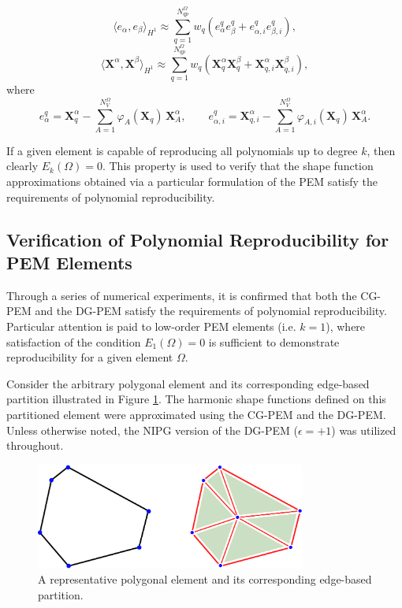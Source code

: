 \begin{equation}
        \langle e_\alpha, e_\beta \rangle_{H^1} \approx \sum_{q=1}^{N^{\Omega}_{qp}} w_q (e_{\alpha}^{q} e_{\beta}^{q} + e_{\alpha,i}^{q} e_{\beta,i}^{q}),
\end{equation}
\begin{equation}
        \langle \mathbf{X}^\alpha, \mathbf{X}^\beta \rangle_{H^1} \approx \sum_{q=1}^{N^{\Omega}_{qp}} w_q (\mathbf{X}^{\alpha}_{q} \mathbf{X}^{\beta}_{q} + \mathbf{X}^{\alpha}_{q,i} \mathbf{X}^{\beta}_{q,i}),
\end{equation}
where
\begin{equation}
        e_{\alpha}^{q} = \mathbf{X}^{\alpha}_{q} - \sum_{A = 1}^{N^{\Omega}_V} \varphi_A (\mathbf{X}_{q}) \, \mathbf{X}_A^{\alpha}, \qquad e_{\alpha,i}^{q} = \mathbf{X}^{\alpha}_{q,i} - \sum_{A = 1}^{N^{\Omega}_V} \varphi_{A,i} (\mathbf{X}_{q}) \, \mathbf{X}_A^{\alpha}.
\end{equation}

If a given element is capable of reproducing all polynomials up to degree $k$, then clearly $E_k(\Omega) = 0$. This property is used to verify that the shape function approximations obtained via a particular formulation of the PEM satisfy the requirements of polynomial reproducibility.

\subsection*{Verification of Polynomial Reproducibility for PEM Elements}

Through a series of numerical experiments, it is confirmed that both the CG-PEM and the DG-PEM satisfy the requirements of polynomial reproducibility. Particular attention is paid to low-order PEM elements (i.e. $k=1$), where satisfaction of the condition $E_1 (\Omega) = 0$ is sufficient to demonstrate reproducibility for a given element $\Omega$.

Consider the arbitrary polygonal element and its corresponding edge-based partition illustrated in Figure \ref{fig:reproducing_element_shape}. The harmonic shape functions defined on this partitioned element were approximated using the CG-PEM and the DG-PEM. Unless otherwise noted, the NIPG version of the DG-PEM ($\epsilon = +1$) was utilized throughout.

\begin{figure}[!h]
  \centering
  \includegraphics[width=3.5in]{figures/reproducing_element_shape.pdf}  \caption{A representative polygonal element and its corresponding edge-based partition.}
  \label{fig:reproducing_element_shape}
\end{figure}

